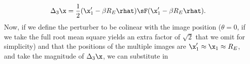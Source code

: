 \begin{equation}
\Delta_3 \x = \frac{1}{2} (\x'_1 - \beta R_E \rhat) \sF (\x'_1 - \beta R_E \rhat).
\end{equation}
Now, if we define the perturber to be colinear with the image position ($\theta  = 0$, if we take the full root mean square yields an extra factor of $\sqrt{2}$ that we omit for simplicity) and that the positions of the multiple images are $\x'_1 \approx \x_1 \approx R_E$, and take the magnitude of $\Delta_3 \x$, we can substitute in
  